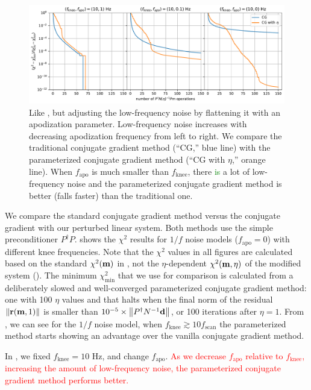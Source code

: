 \documentclass[twocolumn,linenumbers]{aastex631}
\newcommand{\Eq}[1]{\text{Eq.\,\ref{#1}}}
\newcommand{\Figure}[1]{\text{Figure \ref{#1}}}
\newcommand{\vbd}{\vb{d}}
\newcommand{\vbm}{\vb{m}}
\newcommand{\Pdagger}{P^{\dagger}}
\newcommand{\kmh}[1]{\textcolor{red}{#1}}
\newcommand{\textgreen}[1]{\textcolor{green}{#1}}
\begin{document}
\begin{figure}[tb!]
\centering
\includegraphics[width=\textwidth]{flattened_noise_chi2.pdf}
\caption{Like \Figure{1/f noise chi2}, but adjusting the low-frequency noise by flattening it with an apodization parameter.
    Low-frequency noise increases with decreasing apodization frequency from left to right.
    We compare the traditional conjugate gradient method (``{CG},'' blue line) 
    with the parameterized conjugate gradient method (``{CG with $\eta$},'' orange line).
    When $f_\text{apo}$ is much smaller than $f_\text{knee}$, there \textgreen{is} a lot of low-frequency noise and
    the parameterized conjugate gradient method is better (falls faster) than the traditional one.
}
\label{apo noise chi2}
\end{figure}

{
We compare the standard conjugate gradient method versus the conjugate gradient with our perturbed linear system.
Both methods use the simple preconditioner $\Pdagger P$.
}
\Figure{1/f noise chi2} shows {the $\chi^2$ results} for {$1/f$ noise models} ($f_\text{apo}=0$)  with different knee frequencies.
Note that the $\chi^2$ values in all figures are calculated based on the standard $\chi^2(\vbm)$ in \Eq{chi2 formula},
not the $\eta$-dependent $\chi^2(\vbm, \eta)$ of the modified system (\Eq{chi2 eta formula}).
The minimum $\chi^2_{\text{min}}$ that we use for comparison is calculated from a deliberately slowed and well-converged parameterized conjugate gradient
method: one with 100 $\eta$ values and that halts when the final norm of the residual $\norm{\vb{r}(\vbm,1)}$
is smaller than $10^{-5}\times\norm{\Pdagger N^{-1} \vbd}$, or 100 iterations after $\eta=1$.
From \Figure{1/f noise chi2}, we can see for the $1/f$ noise model,
when $f_\text{knee} \gtrsim 10 f_\text{scan}$ the parameterized method starts showing an advantage
over {the} vanilla conjugate gradient method.


In \Figure{apo noise chi2}, we fixed $f_\text{knee}=10$ Hz, and change $f_\text{apo}$.
\kmh{
As we decrease $f_\text{apo}$ relative to $f_\text{knee}$, increasing the amount of low-frequency noise,  the parameterized conjugate gradient method performs better.
}
\end{document}
